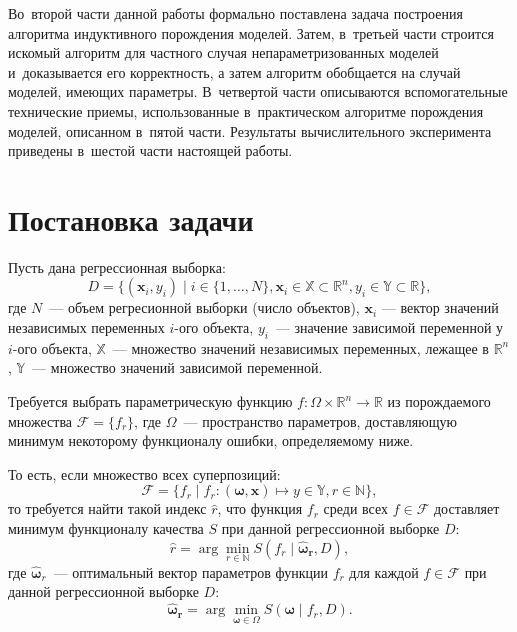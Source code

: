 \documentclass[12pt,a4paper]{article}
\begin{document}
Во~второй части данной работы формально поставлена задача построения алгоритма
индуктивного порождения моделей. Затем, в~третьей части строится искомый
алгоритм для частного случая непараметризованных моделей и~доказывается его
корректность, а затем алгоритм обобщается на случай моделей, имеющих параметры.
В~четвертой части описываются вспомогательные технические приемы, использованные
в~практическом алгоритме порождения моделей, описанном в~пятой части. Результаты
вычислительного эксперимента приведены в~шестой части настоящей работы.

\section{Постановка задачи}

Пусть дана регрессионная выборка:
\[
D = \{ (\mathbf{x}_i, y_i) \mid i \in \{1, \dots, N\},
			\mathbf{x}_i \in \mathbb{X} \subset \mathbb{R}^n,
			y_i \in \mathbb{Y} \subset \mathbb{R} \},
\]
где $N$~--- объем регресионной выборки (число объектов), $\mathbf{x}_i$
--- вектор значений независимых переменных $i$-ого объекта, $y_i$~---
значение зависимой переменной у $i$-ого объекта, $\mathbb{X}$~--- множество
значений независимых переменных, лежащее в $\mathbb{R}^n$, $\mathbb{Y}$~---
множество значений зависимой переменной.

Требуется выбрать параметрическую функцию
$f : \Omega \times \mathbb{R}^n \rightarrow \mathbb{R}$ из
порождаемого множества $\mathcal{F} = \{ f_r \}$, где $\Omega$~--- пространство
параметров, доставляющую минимум некоторому функционалу ошибки, определяемому
ниже.

То есть, если множество всех суперпозиций:
\[
\mathcal{F} = \{ f_r \mid
			f_r : (\boldsymbol{\omega}, \mathbf{x}) \mapsto y \in \mathbb{Y},
			r \in \mathbb{N} \},
\]
то требуется найти такой индекс $\hat{r}$, что функция $f_r$ среди всех
$f \in \mathcal{F}$ доставляет минимум функционалу качества $S$ при данной
регрессионной выборке $D$:
\begin{equation}
  \label{eq:hat_r}
  \hat{r} = \arg \min_{r \in \mathbb{N}} S (f_r \mid \boldsymbol{\hat{\omega}_r}, D),
\end{equation}
где $\boldsymbol{\hat{\omega}}_r$~--- оптимальный вектор параметров функции
$f_r$ для каждой $f \in \mathcal{F}$ при данной регрессионной выборке $D$:
\begin{equation}
  \label{eq:hat_omega}
  \boldsymbol{\hat{\omega}_r} = \arg \min_{\boldsymbol{\omega} \in \Omega} S(\boldsymbol{\omega} \mid f_r, D).
\end{equation}
\end{document}
